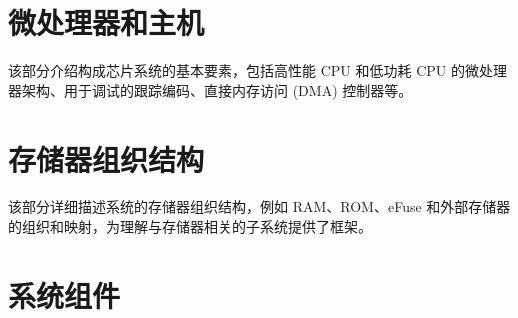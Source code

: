 \documentclass[openany, 10pt]{book}
\begin{document}
\setchineseformatting




\clearpage

\clearpage


\tableofcontents
\clearpage
\listoftables
\clearpage
\listoffigures





\part{微处理器和主机}


该部分介绍构成芯片系统的基本要素，包括高性能 CPU 和低功耗 CPU 的微处理器架构、用于调试的跟踪编码、直接内存访问 (DMA) 控制器等。


\part{存储器组织结构}

该部分详细描述系统的存储器组织结构，例如 RAM、ROM、eFuse 和外部存储器的组织和映射，为理解与存储器相关的子系统提供了框架。


\part{系统组件}

\end{document}
